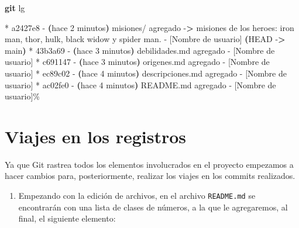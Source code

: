 \documentclass[
]{book}
\newenvironment{Shaded}{\begin{snugshade}}{\end{snugshade}}
\newcommand{\AttributeTok}[1]{\textcolor[rgb]{0.13,0.29,0.53}{#1}}
\newcommand{\ErrorTok}[1]{\textcolor[rgb]{0.64,0.00,0.00}{\textbf{#1}}}
\newcommand{\ExtensionTok}[1]{#1}
\newcommand{\FunctionTok}[1]{\textcolor[rgb]{0.13,0.29,0.53}{\textbf{#1}}}
\newcommand{\KeywordTok}[1]{\textcolor[rgb]{0.13,0.29,0.53}{\textbf{#1}}}
\newcommand{\NormalTok}[1]{#1}
\newcommand{\OperatorTok}[1]{\textcolor[rgb]{0.81,0.36,0.00}{\textbf{#1}}}
\providecommand{\tightlist}{%
  \setlength{\itemsep}{0pt}\setlength{\parskip}{0pt}}
\begin{document}
\begin{Shaded}
\begin{Highlighting}[]
\FunctionTok{git}\NormalTok{ lg}
\end{Highlighting}
\end{Shaded}

\begin{Shaded}
\begin{Highlighting}[]
\ExtensionTok{*}\NormalTok{ a2427e8 }\AttributeTok{{-}} \ErrorTok{(}\ExtensionTok{hace}\NormalTok{ 2 minutos}\KeywordTok{)} \ExtensionTok{misiones/}\NormalTok{ agregado }\AttributeTok{{-}}\OperatorTok{\textgreater{}}\NormalTok{ misiones de los heroes: iron man, thor, hulk, black widow y spider man. }\AttributeTok{{-}}\NormalTok{ [Nombre de usuario] }\ErrorTok{(}\ExtensionTok{HEAD} \AttributeTok{{-}}\OperatorTok{\textgreater{}}\NormalTok{ main}\KeywordTok{)}
\ExtensionTok{*}\NormalTok{ 43b3a69 }\AttributeTok{{-}} \ErrorTok{(}\ExtensionTok{hace}\NormalTok{ 3 minutos}\KeywordTok{)} \ExtensionTok{debilidades.md}\NormalTok{ agregado }\AttributeTok{{-}}\NormalTok{ [Nombre de usuario]}
\ExtensionTok{*}\NormalTok{ c691147 }\AttributeTok{{-}} \ErrorTok{(}\ExtensionTok{hace}\NormalTok{ 3 minutos}\KeywordTok{)} \ExtensionTok{origenes.md}\NormalTok{ agregado }\AttributeTok{{-}}\NormalTok{ [Nombre de usuario]}
\ExtensionTok{*}\NormalTok{ ec89c02 }\AttributeTok{{-}} \ErrorTok{(}\ExtensionTok{hace}\NormalTok{ 4 minutos}\KeywordTok{)} \ExtensionTok{descripciones.md}\NormalTok{ agregado }\AttributeTok{{-}}\NormalTok{ [Nombre de usuario]}
\ExtensionTok{*}\NormalTok{ ac02fe0 }\AttributeTok{{-}} \ErrorTok{(}\ExtensionTok{hace}\NormalTok{ 4 minutos}\KeywordTok{)} \ExtensionTok{README.md}\NormalTok{ agregado }\AttributeTok{{-}}\NormalTok{ [Nombre de usuario]\%  }
\end{Highlighting}
\end{Shaded}

\section{Viajes en los registros}\label{viajes-en-los-registros}

Ya que Git rastrea todos los elementos involucrados en el proyecto empezamos a hacer cambios para, posteriormente, realizar los viajes en los commits realizados.

\begin{enumerate}
\def\labelenumi{\arabic{enumi}.}
\tightlist
\item
  Empezando con la edición de archivos, en el archivo \texttt{README.md} se encontrarán con una lista de clases de números, a la que le agregaremos, al final, el siguiente elemento:
\end{enumerate}
\end{document}
